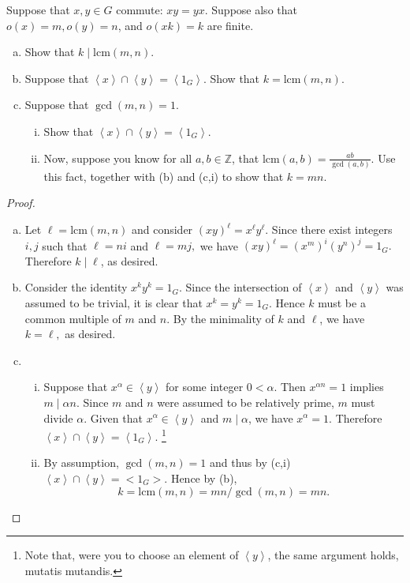 \documentclass[10pt]{amsart}
\begin{document}
\begin{thm}
	Suppose that $x,y \in G$ commute: $xy = yx$.  Suppose also that $o(x) = m, o(y) = n$, and $o(xk) = k$ are finite.
	\begin{enumerate}[(a)]
		\item
                  Show that $k \mid \text{lcm}(m,n).$
		\item
                  Suppose that $\left< x \right> \cap \left< y \right> = \left< 1_G \right>.$  Show that $k = \text{lcm}(m,n).$
                \item
                  Suppose that $\gcd(m,n) = 1.$
		\begin{enumerate}[i.]
			\item 
                          Show that $\left< x \right> \cap \left< y \right> = \left< 1_G \right>.$
			\item
                          Now, suppose you know for all $a,b \in \mathbb{Z}$, that $\text{lcm}(a,b) = \displaystyle{\frac{ab}{\gcd(a,b)}.}$  Use this fact, together with (b) and (c,i) to show that $k = mn.$
		\end{enumerate}
	\end{enumerate}
	\begin{proof}
          \begin{enumerate}[(a)]
          \item
            Let $\ell = \text{lcm}(m,n)$ and consider $(xy)^\ell = x^\ell y^\ell.$
            Since there exist integers $i,j$ such that $\ell = ni$ and $\ell = mj,$ we have $(xy)^\ell = (x^m)^i(y^n)^j = 1_G.$  
            Therefore $k \mid \ell$, as desired.
          \item
            Consider the identity $x^ky^k = 1_G.$  Since the intersection of $\left< x \right>$ and $\left< y \right>$ was assumed to be trivial, it is clear that $x^k = y^k = 1_G.$
            Hence $k$ must be a common multiple of $m$ and $n$.
            By the minimality of $k$ and $\ell$, we have $k = \ell,$ as desired.
          \item
            \begin{enumerate}[i.]
              \item
                Suppose that $x^\alpha \in \left< y \right>$ for some integer $0 < \alpha$.
                Then $x^{\alpha n} = 1$ implies $m \mid \alpha n$.
                Since $m$ and $n$ were assumed to be relatively prime,  $m$ must divide $\alpha$.
                Given that $x^\alpha \in \left< y \right>$ and $m \mid \alpha$, we have $x^\alpha = 1.$  
                Therefore $\left< x \right> \cap \left< y \right> = \left< 1_G \right>$.
                \footnote[1]{Note that, were you to choose an element of $\left< y \right>$, the same argument holds, mutatis mutandis.}
              \item
                By assumption, $\gcd(m,n) = 1$ and thus by (c,i) $\left< x \right> \cap \left< y \right> = <1_G>.$  
                Hence by (b), $$k = \text{lcm}(m,n) = mn/\gcd(m,n) = mn.$$
            \end{enumerate}
          \end{enumerate}
	\end{proof}
\end{thm}
\end{document}
